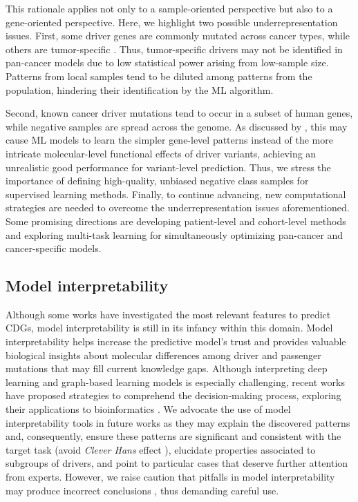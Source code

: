 This rationale applies not only to a sample-oriented perspective but also to a gene-oriented perspective. Here, we highlight two possible underrepresentation issues. First, some driver genes are commonly mutated across cancer types, while others are tumor-specific \cite{poulos2019finding}. Thus, tumor-specific drivers may not be identified in pan-cancer models due to low statistical power arising from low-sample size.  Patterns from local samples tend to be diluted among patterns from the population, hindering their identification by the ML algorithm.  

Second, known cancer driver mutations tend to occur in a subset of human genes, while negative samples are spread across the genome. As discussed by \citet{raimondi2021current}, this may cause ML models to learn the simpler gene-level patterns instead of the more intricate molecular-level functional effects of driver variants, achieving an unrealistic good performance for variant-level prediction. Thus, we stress the importance of defining high-quality, unbiased negative class samples for supervised learning methods. Finally, to continue advancing, new computational strategies are needed to overcome the underrepresentation issues aforementioned. Some promising directions are developing patient-level and cohort-level methods and exploring multi-task learning for simultaneously optimizing pan-cancer and cancer-specific models. 

\subsection{Model interpretability}

Although some works have investigated the most relevant features to predict CDGs, model interpretability is still in its infancy within this domain. Model interpretability helps increase the predictive model's trust and provides valuable biological insights about molecular differences among driver and passenger mutations that may fill current knowledge gaps. Although interpreting deep learning and graph-based learning models is especially challenging, recent works have proposed strategies to comprehend the decision-making process, exploring their applications to bioinformatics \cite{schulte2021integration, talukder2021interpretation}. We advocate the use of model interpretability tools in future works as they may explain the discovered patterns and, consequently, ensure these patterns are significant and consistent with the target task (\ie avoid \textit{Clever Hans} effect \cite{lapuschkin2019unmasking}), elucidate properties associated to subgroups of drivers, and point to particular cases that deserve further attention from experts. However, we raise caution that pitfalls in model interpretability may produce incorrect conclusions \cite{molnar2020general}, thus demanding careful use.

